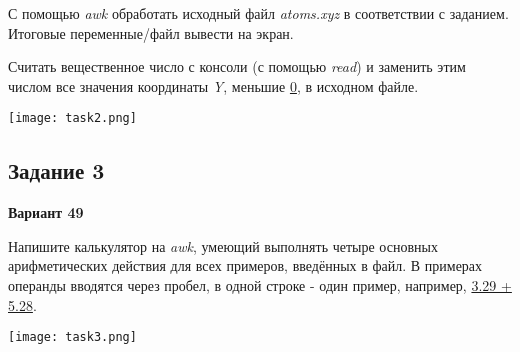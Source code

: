 \documentclass[12pt, a4paper]{report}
\begin{document}
	\par
	С помощью \textit{awk} обработать исходный файл \textit{atoms.xyz} в соответствии с заданием. Итоговые переменные/файл вывести на экран.
	\par
	Считать вещественное число с консоли (с помощью \textit{read}) и заменить этим числом все значения координаты \textit{Y}, меньшие \underline{0}, в исходном файле.
	\lstset{style=mystyle}
	
	
	\begin{center}
		\texttt{[image: task2.png]}
	\end{center}

	\subsection*{Задание 3}
	\large
	\begin{center}
		\textbf{Вариант 49}
	\end{center}
	Напишите калькулятор на \textit{awk}, умеющий выполнять четыре основных арифметических действия для всех примеров, введённых в файл. В примерах операнды вводятся через пробел, в одной строке - один пример, например, \underline{3.29 + 5.28}.
	\par
	\lstset{style=mystyle}
	
	
	
	\begin{center}
		\texttt{[image: task3.png]}
	\end{center}
\end{document}
